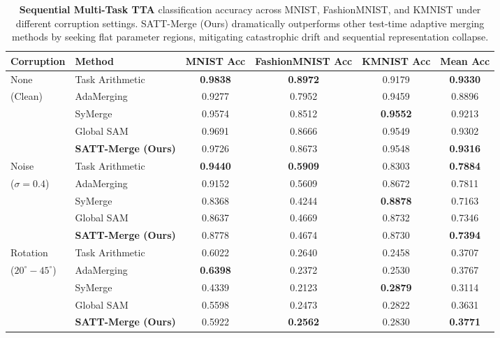 \documentclass{article}
\begin{document}
\begin{table}[t]
\caption{\textbf{Sequential Multi-Task TTA} classification accuracy across MNIST, FashionMNIST, and KMNIST under different corruption settings. SATT-Merge (Ours) dramatically outperforms other test-time adaptive merging methods by seeking flat parameter regions, mitigating catastrophic drift and sequential representation collapse.}
\label{tab:sequential_results}
\vskip 0.15in
\begin{center}
\begin{small}
\begin{sc}
\begin{tabular}{llcccc}
\toprule
Corruption & Method & MNIST Acc & FashionMNIST Acc & KMNIST Acc & Mean Acc \\
\midrule
None & Task Arithmetic & \textbf{0.9838} & \textbf{0.8972} & 0.9179 & \textbf{0.9330} \\
(Clean) & AdaMerging & 0.9277 & 0.7952 & 0.9459 & 0.8896 \\
 & SyMerge & 0.9574 & 0.8512 & \textbf{0.9552} & 0.9213 \\
 & Global SAM & 0.9691 & 0.8666 & 0.9549 & 0.9302 \\
 & \textbf{SATT-Merge (Ours)} & 0.9726 & 0.8673 & 0.9548 & \textbf{0.9316} \\
\midrule
Noise & Task Arithmetic & \textbf{0.9440} & \textbf{0.5909} & 0.8303 & \textbf{0.7884} \\
($\sigma=0.4$) & AdaMerging & 0.9152 & 0.5609 & 0.8672 & 0.7811 \\
 & SyMerge & 0.8368 & 0.4244 & \textbf{0.8878} & 0.7163 \\
 & Global SAM & 0.8637 & 0.4669 & 0.8732 & 0.7346 \\
 & \textbf{SATT-Merge (Ours)} & 0.8778 & 0.4674 & 0.8730 & \textbf{0.7394} \\
\midrule
Rotation & Task Arithmetic & 0.6022 & 0.2640 & 0.2458 & 0.3707 \\
($20^\circ-45^\circ$) & AdaMerging & \textbf{0.6398} & 0.2372 & 0.2530 & 0.3767 \\
 & SyMerge & 0.4339 & 0.2123 & \textbf{0.2879} & 0.3114 \\
 & Global SAM & 0.5598 & 0.2473 & 0.2822 & 0.3631 \\
 & \textbf{SATT-Merge (Ours)} & 0.5922 & \textbf{0.2562} & 0.2830 & \textbf{0.3771} \\
\bottomrule
\end{tabular}
\end{sc}
\end{small}
\end{center}
\vskip -0.1in
\end{table}
\end{document}

